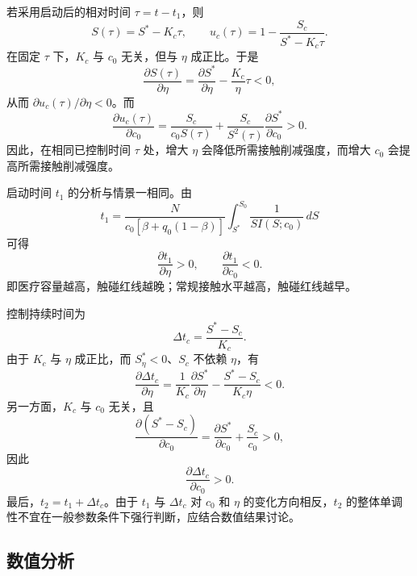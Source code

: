 若采用启动后的相对时间 $\tau=t-t_1$，则
\begin{equation}
S(\tau)=S^*-K_c\tau,
\qquad
u_c(\tau)=1-\frac{S_c}{S^*-K_c\tau}.
\label{eq:s2:u-tau}
\end{equation}
在固定 $\tau$ 下，$K_c$ 与 $c_0$ 无关，但与 $\eta$ 成正比。于是
\begin{equation}
\frac{\partial S(\tau)}{\partial\eta}
=
\frac{\partial S^*}{\partial\eta}
-\frac{K_c}{\eta}\tau<0,
\end{equation}
从而 $\partial u_c(\tau)/\partial\eta<0$。而
\begin{equation}
\frac{\partial u_c(\tau)}{\partial c_0}
=
\frac{S_c}{c_0S(\tau)}
+
\frac{S_c}{S^2(\tau)}
\frac{\partial S^*}{\partial c_0}>0.
\end{equation}
因此，在相同已控制时间 $\tau$ 处，增大 $\eta$ 会降低所需接触削减强度，而增大 $c_0$ 会提高所需接触削减强度。

启动时间 $t_1$ 的分析与情景一相同。由
\begin{equation}
t_1
=
\frac{N}{c_0[\beta+q_0(1-\beta)]}
\int_{S^*}^{S_0}
\frac{1}{S I(S;c_0)}\,dS
\end{equation}
可得
\begin{equation}
\frac{\partial t_1}{\partial\eta}>0,
\qquad
\frac{\partial t_1}{\partial c_0}<0.
\end{equation}
即医疗容量越高，触碰红线越晚；常规接触水平越高，触碰红线越早。

控制持续时间为
\begin{equation}
\Delta t_c
=
\frac{S^*-S_c}{K_c}.
\end{equation}
由于 $K_c$ 与 $\eta$ 成正比，而 $S^*_\eta<0$、$S_c$ 不依赖 $\eta$，有
\begin{equation}
\frac{\partial\Delta t_c}{\partial\eta}
=
\frac{1}{K_c}\frac{\partial S^*}{\partial\eta}
-
\frac{S^*-S_c}{K_c\eta}<0.
\end{equation}
另一方面，$K_c$ 与 $c_0$ 无关，且
\begin{equation}
\frac{\partial(S^*-S_c)}{\partial c_0}
=
\frac{\partial S^*}{\partial c_0}+\frac{S_c}{c_0}>0,
\end{equation}
因此
\begin{equation}
\frac{\partial\Delta t_c}{\partial c_0}>0.
\end{equation}
最后，$t_2=t_1+\Delta t_c$。由于 $t_1$ 与 $\Delta t_c$ 对 $c_0$ 和 $\eta$ 的变化方向相反，$t_2$ 的整体单调性不宜在一般参数条件下强行判断，应结合数值结果讨论。

\subsection{数值分析}

